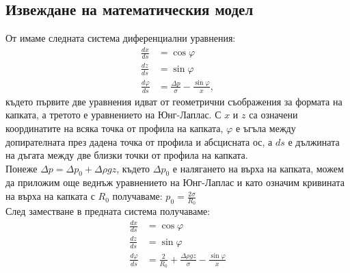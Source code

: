 \documentclass{article}
\begin{document}
\subsection{Извеждане на математическия модел}
От \cite{ASDA_report} имаме следната система диференциални уравнения:
\begin{align*}
\frac {dx}{ds} &= \cos \varphi\\
\frac {dz}{ds} &= \sin \varphi\\
\frac {d\varphi}{ds} &= \frac{\Delta p}{\sigma} - \frac{\sin \varphi}{x},
\end{align*}
където първите две уравнения идват от геометрични съображения за формата на капката, а третото е уравнението на Юнг-Лаплас. С \(x\) и \(z\) са означени координатите на всяка точка от профила на капката, \(\varphi\) е ъгъла между допирателната през дадена точка от профила и абсцисната ос, а \(ds\) е дължината на дъгата между две близки точки от профила на капката.\\

Понеже $\Delta p = \Delta p_0 + \Delta \rho gz$, където $\Delta p_0$ е налягането на върха на капката, можем да приложим още веднъж уравнението на Юнг-Лаплас и като означим кривината на върха на капката с $R_0$ получаваме: $p_0 = \frac{2\sigma}{R_0}$\\
След заместване в предната система получаваме:
\begin{align*}
\frac {dx}{ds} &= \cos \varphi\\
\frac {dz}{ds} &= \sin \varphi\\
\frac {d\varphi}{ds} &= \frac {2} {R_0}  + \frac{\Delta \rho gz}{\sigma} - \frac{\sin \varphi}{x}
\end{align*}
\end{document}
